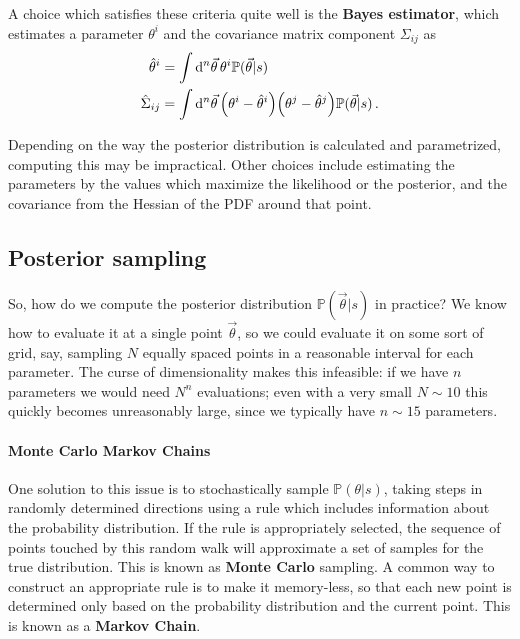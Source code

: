 \documentclass[main.tex]{subfiles}
\begin{document}
A choice which satisfies these criteria quite well is the \textbf{Bayes estimator}, which estimates a parameter \(\theta^{i}\) and the covariance matrix component \(\Sigma_{ij}\) as 
%
\begin{align}
\hat{\theta}^{i} &= \int \dd[n]{\vec{\theta} } \theta^{i}\mathbb{P}(\vec{\theta} | s)  \\
\hat{\Sigma}_{ij} &= \int \dd[n]{\vec{\theta}} 
\qty(\theta^{i}  - \hat{\theta}^{i})
\qty(\theta^{j}  - \hat{\theta}^{j}) 
\mathbb{P}(\vec{\theta} | s)
\,.
\end{align}

Depending on the way the posterior distribution is calculated and parametrized, computing this may be impractical.
Other choices include estimating the parameters by the values which maximize the likelihood or the posterior, and the covariance from the Hessian of the \ac{PDF} around that point. 

\subsection{Posterior sampling}

So, how do we compute the posterior distribution \(\mathbb{P}(\vec{\theta} | s)\) in practice? We know how to evaluate it at a single point \(\vec{\theta}\), so we could evaluate it on some sort of grid, say, sampling \(N\) equally spaced points in a reasonable interval for each parameter.
The curse of dimensionality makes this infeasible: if we have \(n\) parameters we would need \(N^{n}\) evaluations; even with a very small \(N \sim 10\) this quickly becomes unreasonably large, since we typically have \(n \sim 15\) parameters. 

\paragraph{Monte Carlo Markov Chains}

One solution to this issue is to stochastically sample \(\mathbb{P}(\theta | s)\), taking steps in randomly determined directions using a rule which includes information about the probability distribution. 
If the rule is appropriately selected, the sequence of points touched by this random walk will approximate a set of samples for the true distribution. This is known as \textbf{Monte Carlo} sampling. 
A common way to construct an appropriate rule is to make it memory-less, so that each new point is determined only based on the probability distribution and the current point. This is known as a \textbf{Markov Chain}. 
\end{document}
